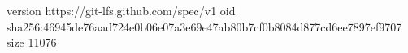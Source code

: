 version https://git-lfs.github.com/spec/v1
oid sha256:46945de76aad724e0b06e07a3e69e47ab80b7cf0b8084d877cd6ee7897ef9707
size 11076
